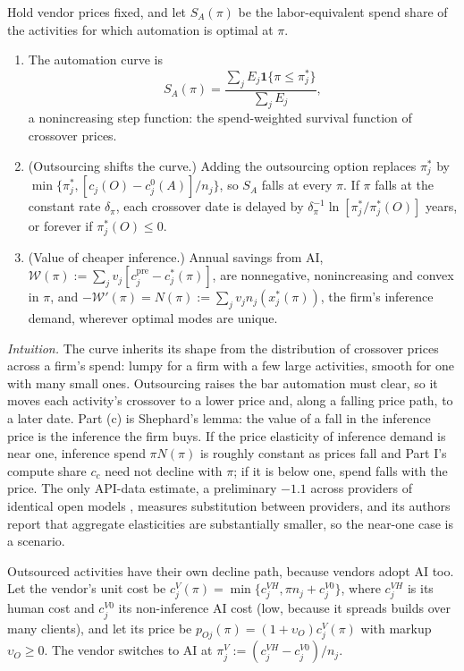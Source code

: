 \begin{proposition}\label{prop:tasks-curve}
Hold vendor prices fixed, and let $S_A(\pi)$ be the labor-equivalent spend share of the activities for which automation is optimal at $\pi$.
\begin{enumerate}
\item[(a)] The automation curve is
\[
S_A(\pi)=\frac{\sum_jE_j\mathbf 1\{\pi\le\pi^*_j\}}{\sum_jE_j},
\]
a nonincreasing step function: the spend-weighted survival function of crossover prices.
\item[(b)] (Outsourcing shifts the curve.) Adding the outsourcing option replaces $\pi^*_j$ by $\min\{\pi^*_j,[c_j(O)-c^0_j(A)]/n_j\}$, so $S_A$ falls at every $\pi$. If $\pi$ falls at the constant rate $\delta_\pi$, each crossover date is delayed by $\delta_\pi^{-1}\ln[\pi^*_j/\pi^*_j(O)]$ years, or forever if $\pi^*_j(O)\le 0$.
\item[(c)] (Value of cheaper inference.) Annual savings from AI, $\mathcal W(\pi):=\sum_jv_j[c^{\mathrm{pre}}_j-c^*_j(\pi)]$, are nonnegative, nonincreasing and convex in $\pi$, and $-\mathcal W'(\pi)=N(\pi):=\sum_jv_jn_j(x^*_j(\pi))$, the firm's inference demand, wherever optimal modes are unique.
\end{enumerate}
\end{proposition}

\noindent\emph{Intuition.} The curve inherits its shape from the distribution of crossover prices across a firm's spend: lumpy for a firm with a few large activities, smooth for one with many small ones. Outsourcing raises the bar automation must clear, so it moves each activity's crossover to a lower price and, along a falling price path, to a later date. Part (c) is Shephard's lemma: the value of a fall in the inference price is the inference the firm buys. If the price elasticity of inference demand is near one, inference spend $\pi N(\pi)$ is roughly constant as prices fall and Part I's compute share $c_c$ need not decline with $\pi$; if it is below one, spend falls with the price. The only API-data estimate, a preliminary $-1.1$ across providers of identical open models \citep{demirer2025emerging}, measures substitution between providers, and its authors report that aggregate elasticities are substantially smaller, so the near-one case is a scenario.

Outsourced activities have their own decline path, because vendors adopt AI too. Let the vendor's unit cost be $c^V_j(\pi)=\min\{c^{VH}_j,\pi n_j+c^{V0}_j\}$, where $c^{VH}_j$ is its human cost and $c^{V0}_j$ its non-inference AI cost (low, because it spreads builds over many clients), and let its price be $p_{Oj}(\pi)=(1+\upsilon_O)c^V_j(\pi)$ with markup $\upsilon_O\ge 0$. The vendor switches to AI at $\pi^V_j:=(c^{VH}_j-c^{V0}_j)/n_j$.

